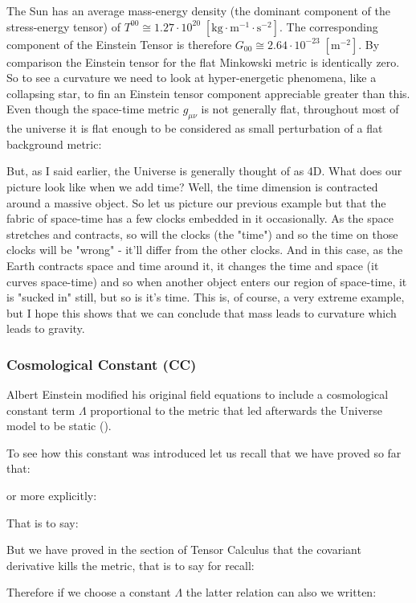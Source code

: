 	The Sun has an average mass-energy density (the dominant component of the stress-energy tensor) of $T^{00}\cong 1.27\cdot 10^{20}\;[\text{kg}\cdot\text{m}^{-1}\cdot\text{s}^{-2}]$. The corresponding component of the Einstein Tensor is therefore $G_{00}\cong 2.64\cdot 10^{-23}\;[\text{m}^{-2}]$. By comparison the Einstein tensor for the flat Minkowski metric is identically zero. So to see a curvature we need to look at hyper-energetic phenomena, like a collapsing star, to fin an Einstein tensor component appreciable greater than this. Even though the space-time metric $g_{\mu\nu}$ is not generally flat, throughout most of the universe it is flat enough to be considered as small perturbation of a flat background metric:
	
	But, as I said earlier, the Universe is generally thought of as 4D. What does our picture look like when we add time? Well, the time dimension is contracted around a massive object. So let us picture our previous example but that the fabric of space-time has a few clocks embedded in it occasionally. As the space stretches and contracts, so will the clocks (the "time") and so the time on those clocks will be "wrong" - it'll differ from the other clocks. And in this case, as the Earth contracts space and time around it, it changes the time and space (it curves space-time) and so when another object enters our region of space-time, it is "sucked in" still, but so is it's time. This is, of course, a very extreme example, but I hope this shows that we can conclude that mass leads to curvature which leads to gravity. 
	
	\pagebreak
	\subsubsection{Cosmological Constant (CC)}
	Albert Einstein modified his original field equations to include a cosmological constant term $\Lambda$ proportional to the metric that led afterwards the Universe model to be static ().
	
	To see how this constant was introduced let us recall that we have proved so far that:
	
	or more explicitly:
	
	That is to say:
	
	But we have proved in the section of Tensor Calculus that the covariant derivative kills the metric, that is to say for recall:
	
	Therefore if we choose a constant $\Lambda$ the latter relation can also we written:
	
